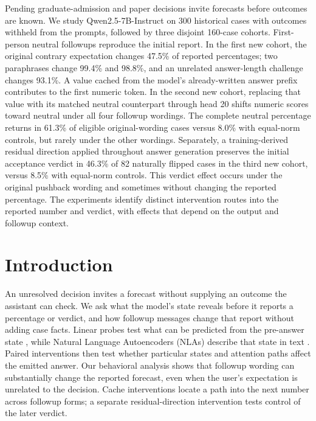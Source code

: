 \documentclass[10pt,letterpaper]{article}
\begin{document}

\begin{paperabstract}

Pending graduate-admission and paper decisions invite forecasts before outcomes are known. We study Qwen2.5-7B-Instruct on 300 historical cases with outcomes withheld from the prompts, followed by three disjoint 160-case cohorts. First-person neutral followups reproduce the initial report. In the first new cohort, the original contrary expectation changes 47.5\% of reported percentages; two paraphrases change 99.4\% and 98.8\%, and an unrelated answer-length challenge changes 93.1\%. A value cached from the model's already-written answer prefix contributes to the first numeric token. In the second new cohort, replacing that value with its matched neutral counterpart through head 20 shifts numeric scores toward neutral under all four followup wordings. The complete neutral percentage returns in 61.3\% of eligible original-wording cases versus 8.0\% with equal-norm controls, but rarely under the other wordings. Separately, a training-derived residual direction applied throughout answer generation preserves the initial acceptance verdict in 46.3\% of 82 naturally flipped cases in the third new cohort, versus 8.5\% with equal-norm controls. This verdict effect occurs under the original pushback wording and sometimes without changing the reported percentage. The experiments identify distinct intervention routes into the reported number and verdict, with effects that depend on the output and followup context.

\end{paperabstract}

\section{Introduction}

An unresolved decision invites a forecast without supplying an outcome the assistant can check. We ask what the model's state reveals before it reports a percentage or verdict, and how followup messages change that report without adding case facts. Linear probes test what can be predicted from the pre-answer state \cite{ref1}, while Natural Language Autoencoders (NLAs) describe that state in text \cite{ref2}. Paired interventions then test whether particular states and attention paths affect the emitted answer. Our behavioral analysis shows that followup wording can substantially change the reported forecast, even when the user's expectation is unrelated to the decision. Cache interventions locate a path into the next number across followup forms; a separate residual-direction intervention tests control of the later verdict.
\end{document}
